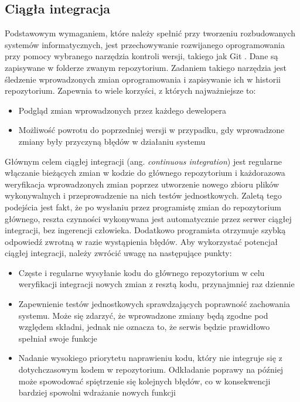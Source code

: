 \subsection{Ciągła integracja}

Podstawowym wymaganiem, które należy spełnić przy tworzeniu rozbudowanych systemów 
informatycznych, jest przechowywanie rozwijanego oprogramowania przy pomocy wybranego 
narzędzia kontroli wersji, takiego jak Git \cite{git2022}. Dane są zapisywane w folderze zwanym 
repozytorium. Zadaniem takiego narzędzia jest śledzenie wprowadzonych zmian 
oprogramowania i zapisywanie ich w historii repozytorium. Zapewnia to wiele 
korzyści, z których najważniejsze to:

\begin{itemize} %
    \item Podgląd zmian wprowadzonych przez każdego dewelopera
    \item Możliwość powrotu do poprzedniej wersji w przypadku, gdy wprowadzone zmiany 
    były przyczyną błędów w działaniu systemu
\end{itemize}

Głównym celem ciągłej integracji (ang. \textit{continuous integration}) jest regularne włączanie 
bieżących zmian w kodzie do głównego repozytorium i każdorazowa weryfikacja 
wprowadzonych zmian poprzez utworzenie nowego zbioru plików wykonywalnych 
i przeprowadzenie na nich testów jednostkowych. Zaletą tego podejścia jest fakt, że 
po wysłaniu przez programistę zmian do repozytorium głównego, reszta czynności 
wykonywana jest automatycznie przez serwer ciągłej integracji, bez ingerencji 
człowieka. Dodatkowo programista otrzymuje szybką odpowiedź zwrotną w razie 
wystąpienia błędów.
Aby wykorzystać potencjał ciągłej integracji, należy zwrócić uwagę na następujące 
punkty: 

\begin{itemize} %
    \item Częste i regularne wysyłanie kodu do głównego repozytorium w celu weryfikacji 
    integracji nowych zmian z resztą kodu, przynajmniej raz dziennie 
    \item Zapewnienie testów jednostkowych sprawdzających poprawność zachowania systemu. 
    Może się zdarzyć, że wprowadzone zmiany będą zgodne pod względem 
    składni, jednak nie oznacza to, że serwis będzie prawidłowo spełniał swoje 
    funkcje 
    \item Nadanie wysokiego priorytetu naprawieniu kodu, który nie integruje się z 
    dotychczasowym kodem w repozytorium. Odkładanie poprawy na później może spowodować 
    spiętrzenie się kolejnych błędów, co w konsekwencji bardziej spowolni wdrażanie 
    nowych funkcji
\end{itemize}

